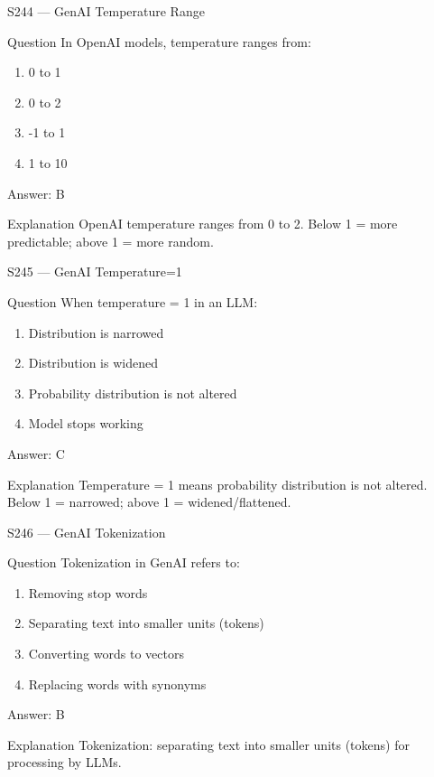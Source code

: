 \documentclass[aspectratio=169,8pt]{beamer}
\begin{document}
	\begin{frame}{S244 --- GenAI Temperature Range}
		\begin{block}{Question}
			In OpenAI models, temperature ranges from:
			\begin{enumerate}
				\item 0 to 1
				\item 0 to 2
				\item -1 to 1
				\item 1 to 10
			\end{enumerate}
		\end{block}
		\begin{exampleblock}{Answer: B}\end{exampleblock}
		\begin{block}{Explanation}
			OpenAI temperature ranges from 0 to 2. Below 1 = more predictable; above 1 = more random.
		\end{block}
	\end{frame}
	
	\begin{frame}{S245 --- GenAI Temperature=1}
		\begin{block}{Question}
			When temperature = 1 in an LLM:
			\begin{enumerate}
				\item Distribution is narrowed
				\item Distribution is widened
				\item Probability distribution is not altered
				\item Model stops working
			\end{enumerate}
		\end{block}
		\begin{exampleblock}{Answer: C}\end{exampleblock}
		\begin{block}{Explanation}
			Temperature = 1 means probability distribution is not altered. Below 1 = narrowed; above 1 = widened/flattened.
		\end{block}
	\end{frame}
	
	\begin{frame}{S246 --- GenAI Tokenization}
		\begin{block}{Question}
			Tokenization in GenAI refers to:
			\begin{enumerate}
				\item Removing stop words
				\item Separating text into smaller units (tokens)
				\item Converting words to vectors
				\item Replacing words with synonyms
			\end{enumerate}
		\end{block}
		\begin{exampleblock}{Answer: B}\end{exampleblock}
		\begin{block}{Explanation}
			Tokenization: separating text into smaller units (tokens) for processing by LLMs.
		\end{block}
	\end{frame}
	
\end{document}
